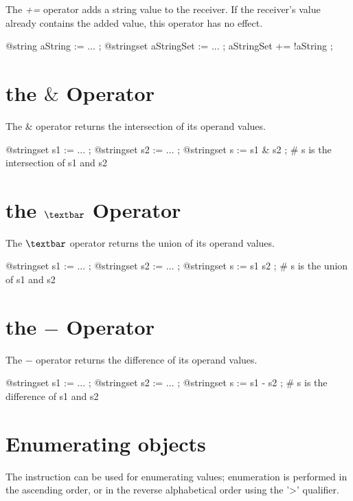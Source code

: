 The \emph{+=} operator adds a string value to the receiver. If the receiver's value already contains the added value, this operator has no effect.

\exempleTroisLignes
{}
{@string aString := ... ;}
{@stringset aStringSet := ... ;}
{aStringSet += !aString ;}




\section{the \emph{$\&$} Operator}

The \emph{$\&$} operator returns the intersection of its operand values.

\exempleTroisLignes
{}
{@stringset s1 := ... ;}
{@stringset s2 := ... ;}
{@stringset s := s1 \& s2 ; \# s is the intersection of s1 and s2}






\section{the \emph{$\textbar$} Operator}

The \emph{$\textbar$} operator returns the union of its operand values.

\exempleTroisLignes
{}
{@stringset s1 := ... ;}
{@stringset s2 := ... ;}
{@stringset s := s1 \textbar s2 ; \# s is the union of s1 and s2}






\section{the \emph{$-$} Operator}

The \emph{$-$} operator returns the difference of its operand values.

\exempleTroisLignes
{}
{@stringset s1 := ... ;}
{@stringset s2 := ... ;}
{@stringset s := s1 - s2 ; \# s is the difference of s1 and s2}








\section{Enumerating  objects}


The  instruction can be used for enumerating  values; enumeration is performed in the ascending order, or in the reverse alphabetical order using the '>' qualifier.


